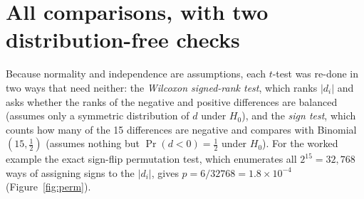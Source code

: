 \documentclass[11pt,a4paper]{article}
\begin{document}
\section{All comparisons, with two distribution-free checks}
Because normality and independence are assumptions, each $t$-test was re-done in two ways that need neither: the \emph{Wilcoxon signed-rank test}, which ranks $|d_i|$ and asks whether the ranks of the negative and positive differences are balanced (assumes only a symmetric distribution of $d$ under $H_0$), and the \emph{sign test}, which counts how many of the 15 differences are negative and compares with Binomial$(15,\tfrac12)$ (assumes nothing but $\Pr(d<0)=\tfrac12$ under $H_0$). For the worked example the exact sign-flip permutation test, which enumerates all $2^{15}=32{,}768$ ways of assigning signs to the $|d_i|$, gives $p=6/32768=1.8\times10^{-4}$ (Figure~\ref{fig:perm}).
\end{document}
